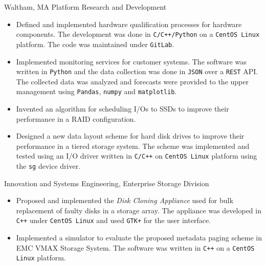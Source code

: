 \documentclass[10pt,a4paper,sans]{moderncv}
\begin{document}
{Waltham, MA} {Platform Research and Development}
{
	\begin{itemize}
		\item Defined and implemented hardware qualification processes for
			hardware components. The development was done in
			\texttt{C/C++/Python} on a \texttt{CentOS Linux} platform. The code
			was maintained under \texttt{GitLab}.
		\item Implemented monitoring services for customer systems. The software
			was written in \texttt{Python} and the data collection was done
			in \texttt{JSON} over a \texttt{REST} API. The collected data was
			analyzed and forecasts were provided to the upper management using
			\texttt{Pandas}, \texttt{numpy} and \texttt{matplotlib}.
	\end{itemize}
}
{
	\begin{itemize}
		\item Invented an algorithm for scheduling I/Os to SSDs to improve
			their performance in a RAID configuration.
		\item Designed a new data layout scheme for hard disk drives to improve
			their performance in a tiered storage system.
			The scheme was implemented and tested using an I/O driver written
			in \texttt{C/C++} on \texttt{CentOS Linux} platform using the \texttt{sg} device driver.
	\end{itemize}
}
{Innovation and Systems Engineering, Enterprise Storage Division}
{
	\begin{itemize}
        \item Proposed and implemented the {\em Disk Cloning Appliance} used for bulk
            replacement of faulty disks in a storage array. The appliance was
			developed in \texttt{C++} under \texttt{CentOS Linux} and used \texttt{GTK+} for the user
			interface.
		\item Implemented a simulator to evaluate the proposed metadata paging
			scheme in EMC VMAX Storage System. The software was written in
			\texttt{C++} on a \texttt{CentOS Linux} platform.
	\end{itemize}
}
\end{document}
